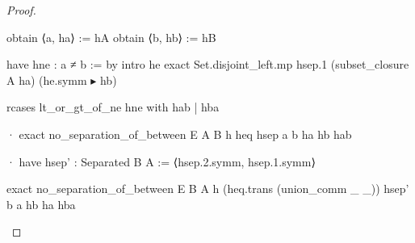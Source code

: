 \begin{proof}
\begin{lean}
      obtain ⟨a, ha⟩ := hA
      obtain ⟨b, hb⟩ := hB

      have hne : a ≠ b := by
        intro he
        exact Set.disjoint_left.mp hsep.1 (subset_closure A ha) (he.symm ▸ hb)

      rcases lt_or_gt_of_ne hne with hab | hba

      · exact no_separation_of_between E A B h heq hsep a b ha hb hab

      · have hsep' : Separated B A := ⟨hsep.2.symm, hsep.1.symm⟩

        exact no_separation_of_between E B A h (heq.trans (union_comm _ _)) hsep' b a hb ha hba
  \end{lean}

\end{proof}
